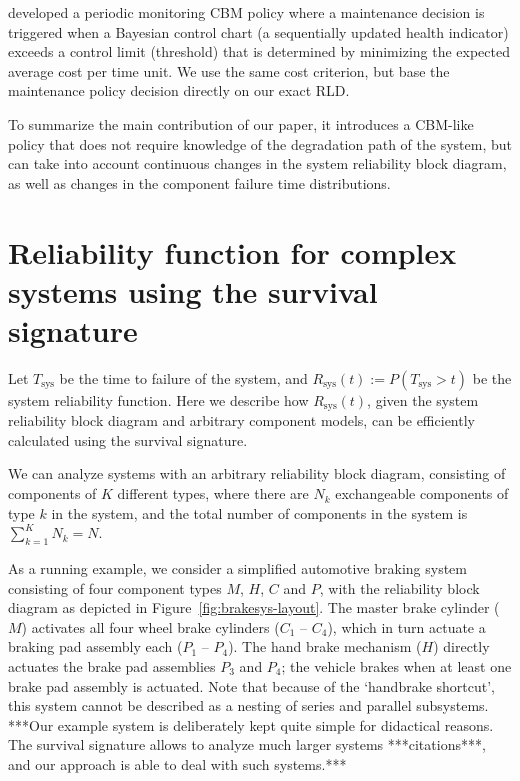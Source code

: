 \documentclass[authoryear]{elsarticle}
\newcommand{\Tsys}{T_\text{sys}}
\newcommand{\Rsys}{R_\text{sys}}
\def\tnow{t_\text{now}}
\newcommand{\Rsysnow}{R^{(t_\text{now})}_\text{sys}}
\begin{document}
\citet{2011:kim-et-al} developed a periodic monitoring CBM policy
where a maintenance decision is triggered when a Bayesian control chart
(a sequentially updated health indicator) exceeds a control limit (threshold)
that is determined by minimizing the expected average cost per time unit.
We use the same cost criterion, but base the maintenance policy decision directly on our exact RLD.

To summarize the main contribution of our paper,
it introduces a CBM-like policy that does not require knowledge of the degradation path of the system,
but can take into account continuous changes in the system reliability block diagram,
as well as changes in the component failure time distributions.



\section{Reliability function for complex systems using the survival signature}
\label{sec:sysrel}

Let $\Tsys$ be the time to failure of the system,
and $\Rsys(t) := P(\Tsys > t)$ be the system reliability function.
Here we describe how $\Rsys(t)$, given the system reliability block diagram and arbitrary component models,
can be efficiently calculated using the survival signature.

We can analyze systems with an arbitrary reliability block diagram,
consisting of components of $K$ different types,
where there are $N_k$ exchangeable components of type $k$ in the system,
and the total number of components in the system is $\sum_{k=1}^K N_k = N$.

As a running example, we consider a simplified automotive braking system
consisting of four component types $M$, $H$, $C$ and $P$,
with the reliability block diagram as depicted in Figure~\ref{fig:brakesys-layout}.
The master brake cylinder ($M$) activates all four wheel brake cylinders ($C_1$ -- $C_4$),
which in turn actuate a braking pad assembly each ($P_1$ -- $P_4$).
The hand brake mechanism ($H$) directly actuates the brake pad assemblies $P_3$ and $P_4$;
the vehicle brakes when at least one brake pad assembly is actuated.
Note that because of the `handbrake shortcut', this system cannot be described as a nesting of series and parallel subsystems.
***Our example system is deliberately kept quite simple for didactical reasons.
The survival signature allows to analyze much larger systems ***citations***,
and our approach is able to deal with such systems.***
\end{document}
